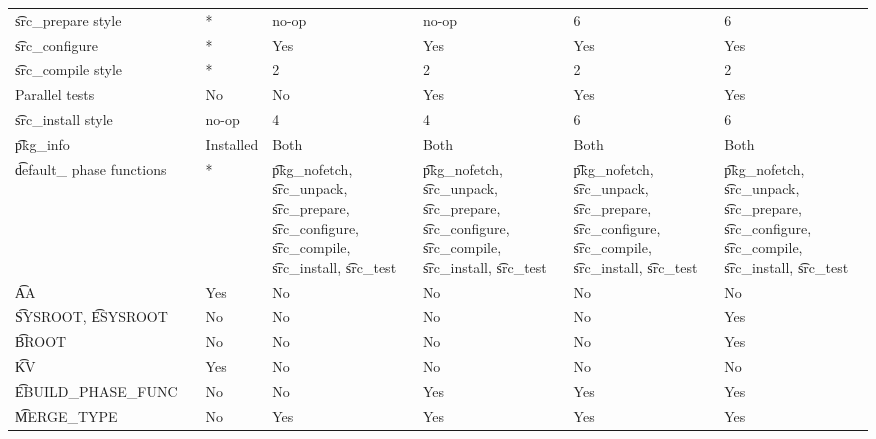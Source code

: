 \begin{landscape}
\begin{longtable}{llP{7.5em}P{7.5em}P{7.5em}P{7.5em}P{7.5em}}
\t{src_prepare} style &  &
    * & no-op & no-op & 6 & 6 \\

\t{src_configure} &  &
    * & Yes & Yes & Yes & Yes \\

\t{src_compile} style &  &
    * & 2 & 2 & 2 & 2 \\

Parallel tests &  &
    No & No & Yes & Yes & Yes \\

\t{src_install} style &  &
    no-op & 4 & 4 & 6 & 6 \\

\t{pkg_info} &  &
    Installed & Both & Both & Both & Both \\

\t{default_} phase functions &  &
    * &
    \t{pkg_nofetch}, \t{src_unpack}, \t{src_prepare}, \t{src_configure},
        \t{src_compile}, \t{src_install}, \t{src_test} &
    \t{pkg_nofetch}, \t{src_unpack}, \t{src_prepare}, \t{src_configure},
        \t{src_compile}, \t{src_install}, \t{src_test} &
    \t{pkg_nofetch}, \t{src_unpack}, \t{src_prepare}, \t{src_configure},
        \t{src_compile}, \t{src_install}, \t{src_test} &
    \t{pkg_nofetch}, \t{src_unpack}, \t{src_prepare}, \t{src_configure},
        \t{src_compile}, \t{src_install}, \t{src_test} \\

\t{AA} &  &
    Yes & No & No & No & No \\

\t{SYSROOT}, \t{ESYSROOT} &  &
    No & No & No & No & Yes \\

\t{BROOT} &  &
    No & No & No & No & Yes \\

\t{KV} &  &
    Yes & No & No & No & No \\

\t{EBUILD_PHASE_FUNC} &  &
    No & No & Yes & Yes & Yes \\

\t{MERGE_TYPE} &  &
    No & Yes & Yes & Yes & Yes \\


\end{longtable}
\end{landscape}

